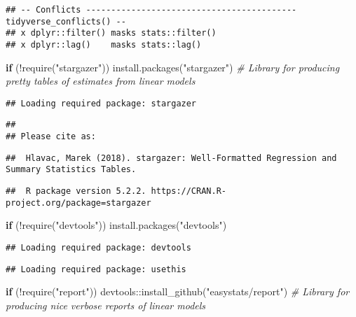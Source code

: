 \documentclass[
]{book}
\newenvironment{Shaded}{\begin{snugshade}}{\end{snugshade}}
\newcommand{\CommentTok}[1]{\textcolor[rgb]{0.56,0.35,0.01}{\textit{#1}}}
\newcommand{\ControlFlowTok}[1]{\textcolor[rgb]{0.13,0.29,0.53}{\textbf{#1}}}
\newcommand{\FunctionTok}[1]{\textcolor[rgb]{0.00,0.00,0.00}{#1}}
\newcommand{\NormalTok}[1]{#1}
\newcommand{\SpecialCharTok}[1]{\textcolor[rgb]{0.00,0.00,0.00}{#1}}
\newcommand{\StringTok}[1]{\textcolor[rgb]{0.31,0.60,0.02}{#1}}
\begin{document}
\begin{verbatim}
## -- Conflicts ------------------------------------------ tidyverse_conflicts() --
## x dplyr::filter() masks stats::filter()
## x dplyr::lag()    masks stats::lag()
\end{verbatim}

\begin{Shaded}
\begin{Highlighting}[]
\ControlFlowTok{if}\NormalTok{ (}\SpecialCharTok{!}\FunctionTok{require}\NormalTok{(}\StringTok{"stargazer"}\NormalTok{)) }\FunctionTok{install.packages}\NormalTok{(}\StringTok{"stargazer"}\NormalTok{) }\CommentTok{\# Library for producing pretty tables of estimates from linear models}
\end{Highlighting}
\end{Shaded}

\begin{verbatim}
## Loading required package: stargazer
\end{verbatim}

\begin{verbatim}
## 
## Please cite as:
\end{verbatim}

\begin{verbatim}
##  Hlavac, Marek (2018). stargazer: Well-Formatted Regression and Summary Statistics Tables.
\end{verbatim}

\begin{verbatim}
##  R package version 5.2.2. https://CRAN.R-project.org/package=stargazer
\end{verbatim}

\begin{Shaded}
\begin{Highlighting}[]
\ControlFlowTok{if}\NormalTok{ (}\SpecialCharTok{!}\FunctionTok{require}\NormalTok{(}\StringTok{"devtools"}\NormalTok{)) }\FunctionTok{install.packages}\NormalTok{(}\StringTok{"devtools"}\NormalTok{)}
\end{Highlighting}
\end{Shaded}

\begin{verbatim}
## Loading required package: devtools
\end{verbatim}

\begin{verbatim}
## Loading required package: usethis
\end{verbatim}

\begin{Shaded}
\begin{Highlighting}[]
\ControlFlowTok{if}\NormalTok{ (}\SpecialCharTok{!}\FunctionTok{require}\NormalTok{(}\StringTok{"report"}\NormalTok{)) devtools}\SpecialCharTok{::}\FunctionTok{install\_github}\NormalTok{(}\StringTok{"easystats/report"}\NormalTok{) }\CommentTok{\# Library for producing nice verbose reports of linear models}
\end{Highlighting}
\end{Shaded}
\end{document}
